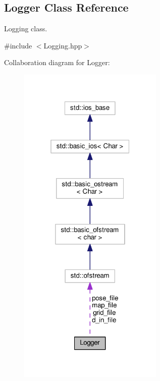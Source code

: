 \hypertarget{classLogger}{}\subsection{Logger Class Reference}
\label{classLogger}


Logging class.  




{\ttfamily \#include $<$Logging.\+hpp$>$}



Collaboration diagram for Logger\+:\nopagebreak
\begin{figure}[H]
\begin{center}
\leavevmode
\includegraphics[width=196pt]{classLogger__coll__graph}
\end{center}
\end{figure}
